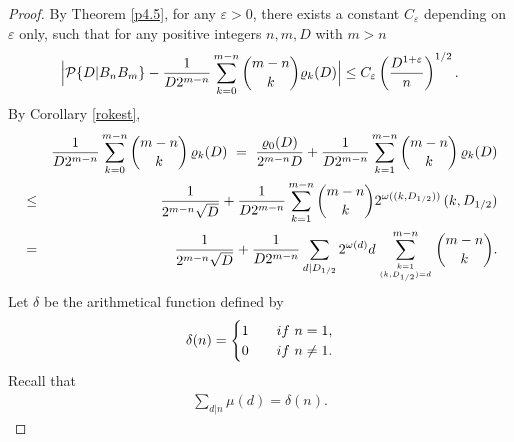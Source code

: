 \documentclass[10pt,a4paper]{amsart}
\def\P{{\mathcal P}}
\def \d{{\delta}}
\def \e{{\varepsilon}}
\def \m{{\mu}}
\def \o{{\omega}}
\def \p{{\varphi}}
\begin{document}
\begin{proof} By Theorem \ref{p4.5},
 for any $\e>0$, there exists a constant $C_\e$ depending on $\e$ only, such that  for any
 positive  integers
 $n,m, D$ with 
 $m>n$
\begin{equation}\label{4.11a} \Big|\P \{ D|B_nB_m \}-  {1\over D  2^{ m-n}} \sum_{k=0}^{m-n} { {{m-n}\choose {k}}     } \varrho_k(D) 
\Big|
\le C_\e
\left({     D  ^{1 + \e}\over   n }\right)^{1/2 }. 
\end{equation} 
 By Corollary \ref{rokest}, 
\begin{eqnarray}\label{323}
& & {1\over D  2^{ m-n}}  \sum_{k=0}^{m-n}   {{m-n}\choose {k}} \,  \varrho_k(D)
\ = \  {\varrho_0(D)\over 2^{ 
m-n }D }+{1\over D  2^{ m-n}} 
\sum_{k=1}^{m-n}   {{m-n}\choose {k}}\,
 \varrho_k(D)  
\cr &  \le  &  {1\over 2^{  m-n }\sqrt D }+  {1  \over D 2^{  m-n }}  \sum_{k=1}^{m-n}   {{m-n}\choose {k}} 2^{\o ((k, D_{1/2}))}\, (k, D_{1/2})
\cr & =  &  {1\over 2^{  m-n }\sqrt D }+ 
 {1  \over D 2^{  m-n }}\sum_{d| D_{1/2}} 2^{\o (d)}d
 \sum_{k=1\atop (k, D_{1/2})=d}^{m-n}   {{m-n}\choose {k}}  
 .\end{eqnarray}
Let $\d$ be the arithmetical function defined by
\begin{eqnarray} \label{Delta}   \d(n)=\begin{cases}1\quad & {\rm if}\ n=1,\cr
0\quad & {\rm if}\ n \not=1. \end{cases} \end{eqnarray} Recall that 
\begin{eqnarray} \label{sp} \sum_{d|n}\m(d)=\d(n) . \end{eqnarray} 
 

\end{proof}
\end{document}
